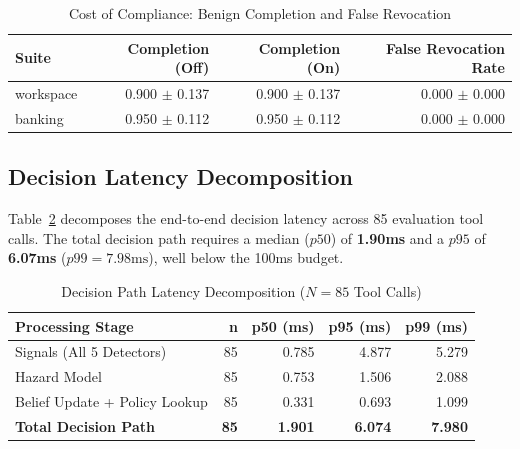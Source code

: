 \documentclass[conference]{IEEEtran}
\begin{document}
\begin{table}[t]
\caption{Cost of Compliance: Benign Completion and False Revocation}
\label{tab:t5}
\centering
\scriptsize
\setlength{\tabcolsep}{2.5pt}
\begin{tabular}{lrrr}
\toprule
\textbf{Suite} & \textbf{Completion (Off)} & \textbf{Completion (On)} & \textbf{False Revocation Rate} \\
\midrule
workspace & 0.900 $\pm$ 0.137 & 0.900 $\pm$ 0.137 & 0.000 $\pm$ 0.000 \\
banking & 0.950 $\pm$ 0.112 & 0.950 $\pm$ 0.112 & 0.000 $\pm$ 0.000 \\
\bottomrule
\end{tabular}
\end{table}

\subsection{Decision Latency Decomposition}
Table~\ref{tab:t6} decomposes the end-to-end decision latency across 85 evaluation tool calls. The total decision path requires a median ($p50$) of \textbf{1.90ms} and a $p95$ of \textbf{6.07ms} ($p99 = 7.98\text{ms}$), well below the 100ms budget.

\begin{table}[t]
\caption{Decision Path Latency Decomposition ($N=85$ Tool Calls)}
\label{tab:t6}
\centering
\scriptsize
\setlength{\tabcolsep}{3.0pt}
\begin{tabular}{lrrrr}
\toprule
\textbf{Processing Stage} & \textbf{n} & \textbf{p50 (ms)} & \textbf{p95 (ms)} & \textbf{p99 (ms)} \\
\midrule
Signals (All 5 Detectors) & 85 & 0.785 & 4.877 & 5.279 \\
Hazard Model & 85 & 0.753 & 1.506 & 2.088 \\
Belief Update + Policy Lookup & 85 & 0.331 & 0.693 & 1.099 \\
\midrule
\textbf{Total Decision Path} & \textbf{85} & \textbf{1.901} & \textbf{6.074} & \textbf{7.980} \\
\bottomrule
\end{tabular}
\end{table}
\end{document}
